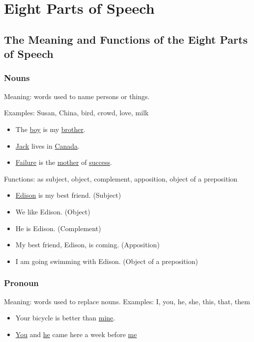 \section{Eight Parts of Speech}

\subsection{The Meaning and Functions of the Eight Parts of Speech}

\subsubsection{Nouns}
Meaning: words used to name persons or things.
\newline
\newline

Examples: Susan, China, bird, crowd, love, milk
\begin{itemize}
    \item The \underline{boy} is my \underline{brother}.
    \item \underline{Jack} lives in \underline{Canada}.
    \item \underline{Failure} is the \underline{mother} of \underline{success}.
\end{itemize}

Functions: as subject, object, complement, apposition, object of a preposition
\begin{itemize}
    \item \underline{Edison} is my best friend. (Subject)
    \item We like Edison. (Object)
    \item He is Edison. (Complement)
    \item My best friend, Edison, is coming. (Apposition)
    \item I am going swimming with Edison. (Object of a preposition)
\end{itemize}

\subsubsection{Pronoun}
Meaning: words used to replace nouns.
\newline
\newline
Examples: I, you, he, she, this, that, them
\begin{itemize}
    \item Your bicycle is better than \underline{mine}.
    \item \underline{You} and \underline{he} came here a week before
        \underline{me}
\end{itemize}

